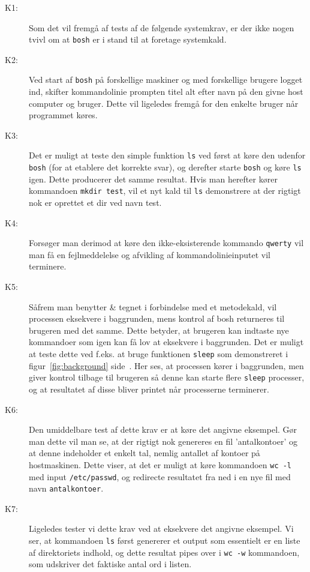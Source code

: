 \documentclass[final]{article}
\begin{document}
\begin{description}
\item[K1:] Som det vil fremgå af tests af de følgende systemkrav, er der ikke nogen tvivl om at \texttt{bosh} er i stand til at foretage systemkald.

\item[K2:] Ved start af \texttt{bosh} på forskellige maskiner og med forskellige brugere logget ind, skifter kommandolinie prompten titel alt efter navn på den givne host computer og bruger. Dette vil ligeledes fremgå for den enkelte bruger når programmet køres.

\item[K3:] Det er muligt at teste den simple funktion \texttt{ls} ved først at køre den udenfor \texttt{bosh} (for at etablere det korrekte svar), og derefter starte \texttt{bosh} og køre \texttt{ls} igen. Dette producerer det samme resultat. Hvis man herefter kører kommandoen \texttt{mkdir test}, vil et nyt kald til \texttt{ls} demonstrere at der rigtigt nok er oprettet et dir ved navn test.

\item[K4:] Forsøger man derimod at køre den ikke-eksisterende kommando \texttt{qwerty} vil man få en fejlmeddelelse og afvikling af kommandolinieinputet vil terminere.

\item[K5:] Såfrem man benytter \& tegnet i forbindelse med et metodekald, vil processen eksekvere i baggrunden, mens kontrol af bosh returneres til brugeren med det samme. Dette betyder, at brugeren kan indtaste nye kommandoer som igen kan få lov at eksekvere i baggrunden. Det er muligt at teste dette ved f.eks. at bruge funktionen \texttt{sleep} som demonstreret i figur~\ref{fig:background} side~\pageref{fig:background}. Her ses, at processen kører i baggrunden, men giver kontrol tilbage til brugeren så denne kan starte flere \texttt{sleep} processer, og at resultatet af disse bliver printet når processerne terminerer. 

\item[K6:] Den umiddelbare test af dette krav er at køre det angivne eksempel. Gør man dette vil man se, at der rigtigt nok genereres en fil 'antalkontoer' og at denne indeholder et enkelt tal, nemlig antallet af kontoer på hostmaskinen. Dette viser, at det er muligt at køre kommandoen \texttt{wc -l}  med input \texttt{/etc/passwd}, og redirecte resultatet fra ned i en nye fil med navn \texttt{antalkontoer}.

\item[K7:] Ligeledes tester vi dette krav ved at eksekvere det angivne eksempel. Vi ser, at kommandoen \texttt{ls} først genererer et output som essentielt er en liste af direktoriets indhold, og dette resultat pipes over i \texttt{wc -w} kommandoen, som udskriver det faktiske antal ord i listen. 


\end{description}
\end{document}
